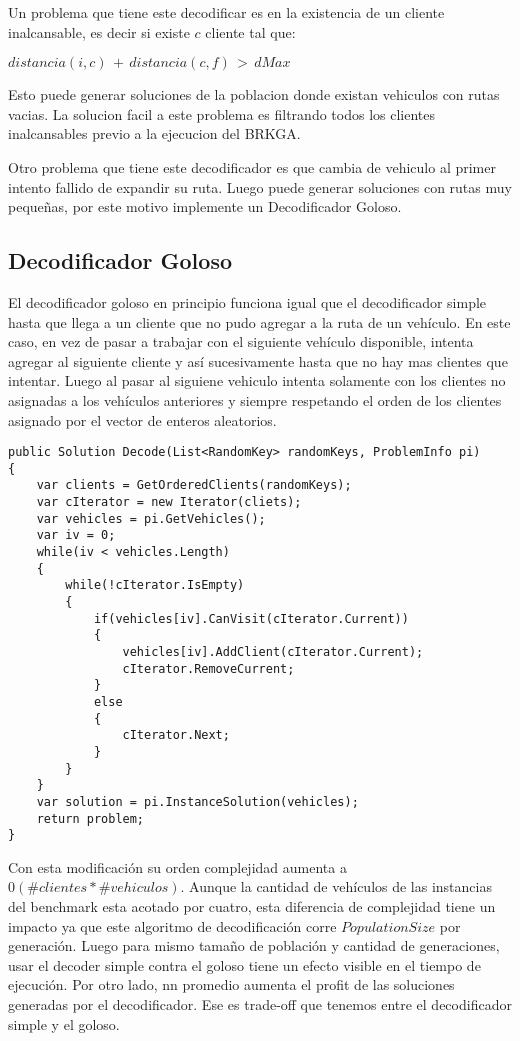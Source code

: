 \bigskip

Un problema que tiene este decodificar es en la existencia de un cliente inalcansable, es decir si existe $c$ cliente tal que:

\( distancia(i, c)\, +\, distancia(c, f)\, >\, dMax\)

Esto puede generar soluciones de la poblacion donde existan vehiculos con rutas vacias. La solucion facil a este problema es filtrando todos los clientes inalcansables previo a la ejecucion del BRKGA.

\bigskip

Otro problema que tiene este decodificador es que cambia de vehiculo al primer intento fallido de expandir su ruta. Luego puede generar soluciones con rutas muy pequeñas, por este motivo implemente un Decodificador Goloso.


\subsection{Decodificador Goloso}

El decodificador goloso en principio funciona igual que el decodificador simple hasta que llega a un cliente que no pudo agregar a la ruta de un vehículo. En este caso, en vez de pasar a trabajar con el siguiente vehículo disponible, intenta agregar al siguiente cliente y así sucesivamente hasta que no hay mas clientes que intentar. Luego al pasar al siguiene vehiculo intenta solamente con los clientes no asignadas a los vehículos anteriores y siempre respetando el orden de los clientes asignado por el vector de enteros aleatorios.

\bigskip

\begin{lstlisting} 
public Solution Decode(List<RandomKey> randomKeys, ProblemInfo pi)
{
	var clients = GetOrderedClients(randomKeys);
	var cIterator = new Iterator(cliets);
	var vehicles = pi.GetVehicles();	
	var iv = 0;
	while(iv < vehicles.Length)
	{
		while(!cIterator.IsEmpty)
		{
			if(vehicles[iv].CanVisit(cIterator.Current))
			{
				vehicles[iv].AddClient(cIterator.Current);
				cIterator.RemoveCurrent;
			}
			else
			{
				cIterator.Next;			
			}			
		}
	}
	var solution = pi.InstanceSolution(vehicles);
	return problem;
}
\end{lstlisting}

\bigskip

Con esta modificación su orden complejidad aumenta a $0(\#clientes * \#vehiculos)$. Aunque la cantidad de vehículos de las instancias del benchmark esta acotado por cuatro, esta diferencia de complejidad tiene un impacto ya que este algoritmo de decodificación corre $PopulationSize$ por generación. Luego para mismo tamaño de población y cantidad de generaciones, usar el decoder simple contra el goloso tiene un efecto visible en el tiempo de ejecución. Por otro lado, nn promedio aumenta el profit de las soluciones generadas por el decodificador. Ese es trade-off que tenemos entre el decodificador simple y el goloso. 

